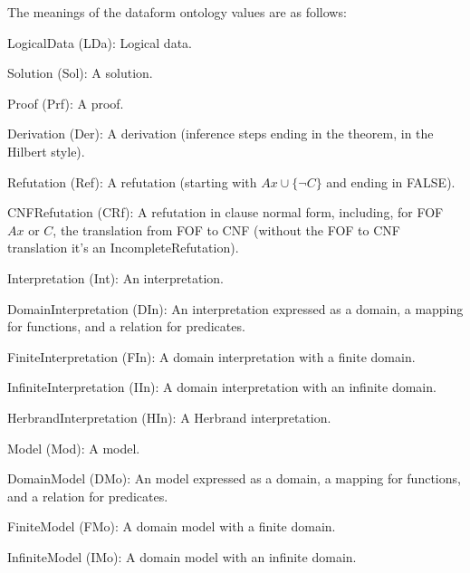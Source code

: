 \documentclass[a4paper]{easychair}
\newenvironment{packed_itemize}{
\vspace*{-0.5em}
\begin{itemize}
  \setlength{\partopsep}{0pt}
  \setlength{\itemsep}{1pt}
  \setlength{\parskip}{0pt}
  \setlength{\parsep}{0pt}
}{\end{itemize}}
\begin{document}
The meanings of the dataform ontology values are as follows:
\begin{packed_itemize}
\item LogicalData (LDa):
      Logical data.

\item Solution (Sol):
      A solution.

\item Proof (Prf):
      A proof.

\item Derivation (Der):
      A derivation (inference steps ending in the theorem, in the
      Hilbert style).

\item Refutation (Ref):
      A refutation (starting with $Ax \cup \{\neg C\}$ and ending in FALSE).

\item CNFRefutation (CRf):
      A refutation in clause normal form, including, for FOF $Ax$ or $C$, 
      the translation from FOF to CNF (without the FOF to CNF translation
      it's an IncompleteRefutation).

\item Interpretation (Int):
      An interpretation.

\item DomainInterpretation (DIn):
      An interpretation expressed as a domain, a mapping for functions, 
      and a relation for predicates.

\item FiniteInterpretation (FIn):
      A domain interpretation with a finite domain.

\item InfiniteInterpretation (IIn):
      A domain interpretation with an infinite domain.

\item HerbrandInterpretation (HIn):
      A Herbrand interpretation.

\item Model (Mod):
      A model.

\item DomainModel (DMo):
      An model expressed as a domain, a mapping for functions, 
      and a relation for predicates.

\item FiniteModel (FMo):
      A domain model with a finite domain.

\item InfiniteModel (IMo):
      A domain model with an infinite domain.


\end{packed_itemize}
\end{document}

